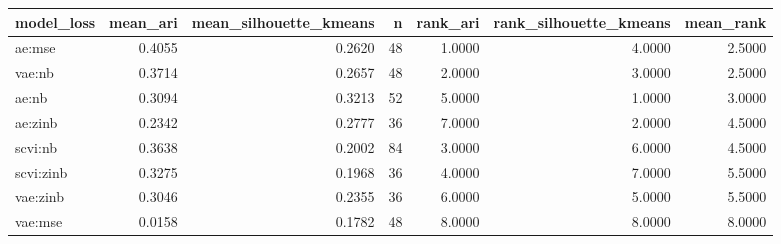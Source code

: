 \begin{tabular}{lrrrrrr}
\toprule
model\_loss & mean\_ari & mean\_silhouette\_kmeans & n & rank\_ari & rank\_silhouette\_kmeans & mean\_rank \\
\midrule
ae:mse & 0.4055 & 0.2620 & 48 & 1.0000 & 4.0000 & 2.5000 \\
vae:nb & 0.3714 & 0.2657 & 48 & 2.0000 & 3.0000 & 2.5000 \\
ae:nb & 0.3094 & 0.3213 & 52 & 5.0000 & 1.0000 & 3.0000 \\
ae:zinb & 0.2342 & 0.2777 & 36 & 7.0000 & 2.0000 & 4.5000 \\
scvi:nb & 0.3638 & 0.2002 & 84 & 3.0000 & 6.0000 & 4.5000 \\
scvi:zinb & 0.3275 & 0.1968 & 36 & 4.0000 & 7.0000 & 5.5000 \\
vae:zinb & 0.3046 & 0.2355 & 36 & 6.0000 & 5.0000 & 5.5000 \\
vae:mse & 0.0158 & 0.1782 & 48 & 8.0000 & 8.0000 & 8.0000 \\
\bottomrule
\end{tabular}
